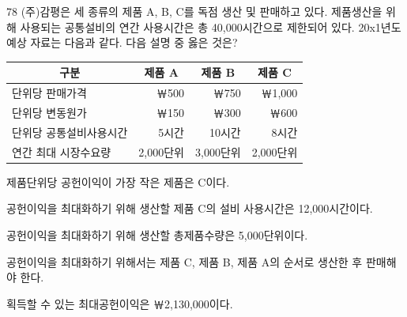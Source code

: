 \begin{question}{78}
(주)감평은 세 종류의 제품 A, B, C를 독점 생산 및 판매하고 있다. 제품생산을 위해 사용되는 공통설비의 연간 사용시간은 총 40,000시간으로 제한되어 있다. 20x1년도 예상 자료는 다음과 같다. 다음 설명 중 옳은 것은?
\par{\small\centering
\begin{tabular}{|l|r|r|r|}
\hline
\multicolumn{1}{|c|}{구분} & \multicolumn{1}{c|}{제품 A} & \multicolumn{1}{c|}{제품 B} & \multicolumn{1}{c|}{제품 C} \\ \hline
단위당 판매가격 & ￦500 & ￦750 & ￦1,000 \\ \hline
단위당 변동원가 & ￦150 & ￦300 & ￦600 \\ \hline
단위당 공통설비사용시간 & 5시간 & 10시간 & 8시간 \\ \hline
연간 최대 시장수요량 & 2,000단위 & 3,000단위 & 2,000단위 \\ \hline
\end{tabular}\par}
\begin{choices}
  \item 제품단위당 공헌이익이 가장 작은 제품은 C이다.
  \item 공헌이익을 최대화하기 위해 생산할 제품 C의 설비 사용시간은 12,000시간이다.
  \item 공헌이익을 최대화하기 위해 생산할 총제품수량은 5,000단위이다.
  \item 공헌이익을 최대화하기 위해서는 제품 C, 제품 B, 제품 A의 순서로 생산한 후 판매해야 한다.
  \item 획득할 수 있는 최대공헌이익은 ￦2,130,000이다.
\end{choices}
\end{question}
